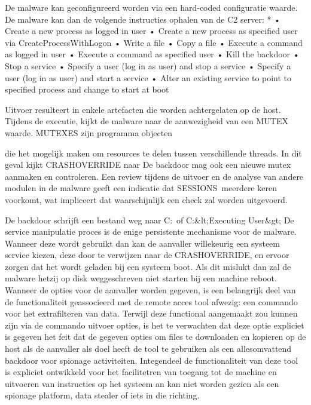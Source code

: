 {De malware kan geconfigureerd worden via een hard-coded configuratie waarde. De malware kan
dan de volgende instructies ophalen van de C2 server:
* • Create a new process as logged in user • Create a new process as specified user via
CreateProcessWithLogon • Write a file • Copy a file • Execute a command as logged in user • Execute
a command as specified user • Kill the backdoor • Stop a service • Specify a user (log in as user) and
stop a service • Specify a user (log in as user) and start a service • Alter an existing service to point to
specified process and change to start at boot

Uitvoer resulteert in enkele artefacten die worden achtergelaten op de host. Tijdens de executie,
kijkt de malware naar de aanwezigheid van een MUTEX waarde. MUTEXES zijn programma objecten

die het mogelijk maken om resources te delen tussen verschillende threads. In dit geval kijkt
CRASHOVERRIDE naar \SESSIONS\1\Windows\ApiPortection
De backdoor mag ook een nieuwe mutex aanmaken en controleren. Een review tijdens de uitvoer en
de analyse van andere modulen in de malware geeft een indicatie dat SESSIONS\1\Windows\
meerdere keren voorkomt, wat impliceert dat waarschijnlijk een check zal worden uitgevoerd.

De backdoor schrijft een bestand weg naar C:\Users\Public\ of C:\Users\&lt;Executing User&gt;
De service manipulatie proces is de enige persistente mechanisme voor de malware. Wanneer deze
wordt gebruikt dan kan de aanvaller willekeurig een systeem service kiezen, deze door te verwijzen
naar de CRASHOVERRIDE, en ervoor zorgen dat het wordt geladen bij een systeem boot. Als dit
mislukt dan zal de malware hetzij op disk weggeschreven niet starten bij een machine reboot.
Wanneer de opties voor de aanvaller worden gegeven, is een belangrijk deel van de functionaliteit
geassocieerd met de remote acces tool afwezig: een commando voor het extrafilteren van data.
Terwijl deze functional aangemaakt zou kunnen zijn via de commando uitvoer opties, is het te
verwachten dat deze optie expliciet is gegeven het feit dat de gegeven opties om files te downloaden
en kopieren op de host als de aanvaller als doel heeft de tool te gebruiken als een allesomvattend
backdoor voor spionage activiteiten. Integendeel de functionaliteit van deze tool is expliciet
ontwikkeld voor het facilitetren van toegang tot de machine en uitvoeren van instructies op het
systeem an kan niet worden gezien als een spionage platform, data stealer of iets in die richting.

}
